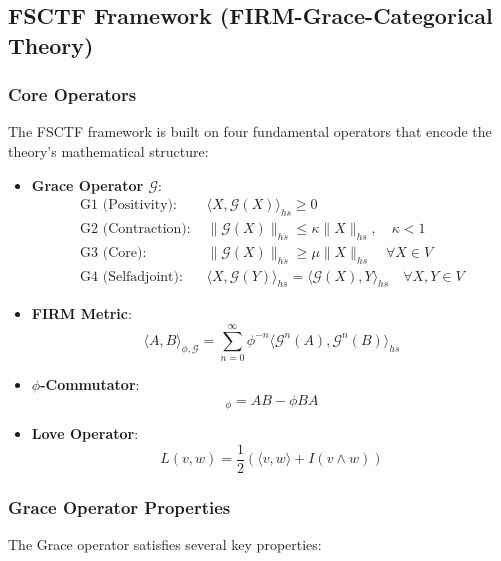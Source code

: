 \documentclass[12pt,a4paper]{article}
\begin{document}
\subsection{FSCTF Framework (FIRM-Grace-Categorical Theory)}

\subsubsection{Core Operators}
The FSCTF framework is built on four fundamental operators that encode the theory's mathematical structure:

\begin{itemize}
\item \textbf{Grace Operator $\mathcal{G}$}:
  \begin{align}
  \text{G1 (Positivity): } &\langle X, \mathcal{G}(X) \rangle_{hs} \geq 0 \\
  \text{G2 (Contraction): } &\|\mathcal{G}(X)\|_{hs} \leq \kappa \|X\|_{hs}, \quad \kappa < 1 \\
  \text{G3 (Core): } &\|\mathcal{G}(X)\|_{hs} \geq \mu \|X\|_{hs} \quad \forall X \in V \\
  \text{G4 (Selfadjoint): } &\langle X, \mathcal{G}(Y) \rangle_{hs} = \langle \mathcal{G}(X), Y \rangle_{hs} \quad \forall X,Y \in V
  \end{align}

\item \textbf{FIRM Metric}:
  \begin{equation}
  \langle A, B \rangle_{\phi, \mathcal{G}} = \sum_{n=0}^\infty \phi^{-n} \langle \mathcal{G}^n(A), \mathcal{G}^n(B) \rangle_{hs}
  \end{equation}

\item \textbf{$\phi$-Commutator}:
  \begin{equation}
  [A, B]_\phi = AB - \phi BA
  \end{equation}

\item \textbf{Love Operator}:
  \begin{equation}
  L(v, w) = \frac{1}{2} (\langle v, w \rangle + I(v \wedge w))
  \end{equation}
\end{itemize}

\subsubsection{Grace Operator Properties}
The Grace operator satisfies several key properties:
\end{document}
